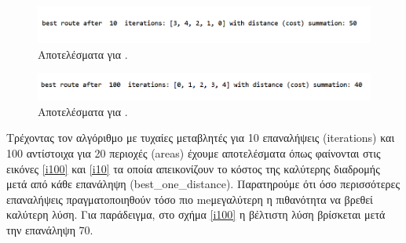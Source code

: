 \begin{figure}
    \centering
    \includegraphics[scale=0.60]{2947_thesis/pictures/ex5.png} 
    \caption{Αποτελέσματα για .}
    \label{iter10}
\end{figure}
\begin{figure}
    \centering
    \includegraphics[scale=0.60]{2947_thesis/pictures/ex6.png} 
    \caption{Αποτελέσματα για .}
    \label{iter100}
\end{figure}

Τρέχοντας τον αλγόριθμο με τυχαίες μεταβλητές για 10 επαναλήψεις (iterations) και 100 αντίστοιχα για 20 περιοχές (areas) έχουμε αποτελέσματα όπως φαίνονται στις εικόνες \ref{i100} και \ref{i10} τα οποία απεικονίζουν το κόστος της καλύτερης διαδρομής μετά από κάθε επανάληψη (best\_one\_distance). Παρατηρούμε ότι όσο περισσότερες επαναλήψεις πραγματοποιηθούν τόσο πιο meμεγαλύτερη η πιθανότητα να βρεθεί καλύτερη λύση. Για παράδειγμα, στο σχήμα \ref{i100} η βέλτιστη λύση βρίσκεται μετά την επανάληψη 70.

